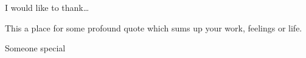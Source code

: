 \documentclass[twoside,openright,frontopenright]{ip3thesis}
\begin{document}
\begin{acknowledgements*}
%
	I would like to thank\ldots
%
\end{acknowledgements*}

\begin{epigraph*}
%
	This a place for some profound quote which sums up your work, feelings or
	life.
%
\end{epigraph*}

\begin{dedication*}
%
	Someone special
%
\end{dedication*}

\cleardoublepage










\appendix


%



\end{document}
